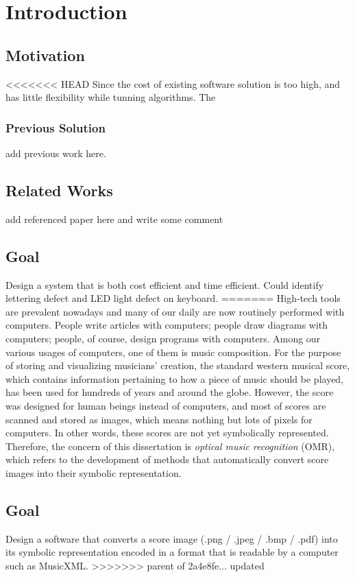 \chapter{Introduction}
\label{c:intro}

\section{Motivation}
<<<<<<< HEAD
Since the cost of existing software solution is too high, and has little flexibility while tunning algorithms.
The

\subsection{Previous Solution}
add previous work here.



\section{Related Works}
\label{section:related-work}
add referenced paper here and write some comment

\section{Goal}
\label{section:goal}
Design a system that is both cost efficient and time efficient. Could identify lettering defect and LED light defect on keyboard.
=======
\label{section:motivation}
High-tech tools are prevalent nowadays and many of our daily are now routinely performed with computers. People write articles with computers; people draw diagrams with computers; people, of course, design programs with computers. Among our various usages of computers, one of them is music composition. For the purpose of storing and visualizing musicians' creation, the standard western musical score, which contains information pertaining to how a piece of music should be played, has been used for hundreds of years and around the globe. However, the score was designed for human beings instead of computers, and most of scores are scanned and stored as images, which means nothing but lots of pixels for computers. In other words, these scores are not yet symbolically represented. Therefore, the concern of this dissertation is \emph{optical music recognition} (OMR), which refers to the development of methods that automatically convert score images into their symbolic representation.

\section{Goal}
\label{section:goal}
Design a software that converts a score image (.png / .jpeg / .bmp / .pdf) into its symbolic representation encoded in a format that is readable by a computer such as MusicXML.
>>>>>>> parent of 2a4e8fe... updated

